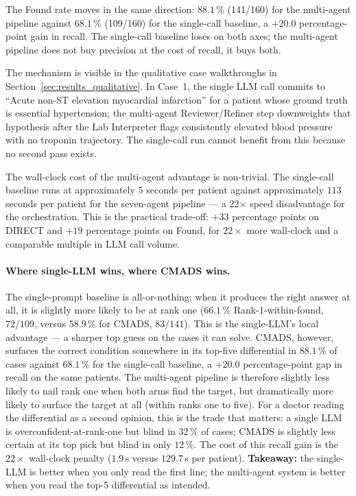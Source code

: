The Found rate moves in the same direction: $88.1\,\%$ (141/160) for
the multi-agent pipeline against $68.1\,\%$ (109/160) for the
single-call baseline, a $+20.0$ percentage-point gain in recall. The
single-call baseline loses on both axes; the multi-agent pipeline
does not buy precision at the cost of recall, it buys both.

The mechanism is visible in the qualitative case walkthroughs in
Section~\ref{sec:results_qualitative}. In Case~1, the single LLM call
commits to ``Acute non-ST elevation myocardial infarction'' for a
patient whose ground truth is essential hypertension; the multi-agent
Reviewer/Refiner step downweights that hypothesis after the Lab
Interpreter flags consistently elevated blood pressure with no
troponin trajectory. The single-call run cannot benefit from this
because no second pass exists.

The wall-clock cost of the multi-agent advantage is
non-trivial. The single-call baseline runs at approximately
$5$ seconds per patient against approximately $113$ seconds per
patient for the seven-agent pipeline --- a 22$\times$ speed
disadvantage for the orchestration. This is the practical trade-off:
$+33$ percentage points on DIRECT and $+19$ percentage points on
Found, for $22\times$ more wall-clock and a comparable multiple in
LLM call volume.

\paragraph{Where single-LLM wins, where CMADS wins.}
The single-prompt baseline is all-or-nothing: when it produces the
right answer at all, it is slightly more likely to be at rank one
($66.1\,\%$ Rank-1-within-found, $72/109$, versus $58.9\,\%$ for
CMADS, $83/141$). This is the single-LLM's local advantage --- a
sharper top guess on the cases it can solve. CMADS, however, surfaces
the correct condition somewhere in its top-five differential in
$88.1\,\%$ of cases against $68.1\,\%$ for the single-call baseline,
a $+20.0$ percentage-point gap in recall on the same patients. The
multi-agent pipeline is therefore slightly less likely to nail rank
one when both arms find the target, but dramatically more likely to
surface the target at all (within ranks one to five). For a doctor
reading the differential as a second opinion, this is the trade that
matters: a single LLM is overconfident-at-rank-one but blind in
$32\,\%$ of cases; CMADS is slightly less certain at its top pick but
blind in only $12\,\%$. The cost of this recall gain is the
$22\times$ wall-clock penalty ($1.9$\,s versus $129.7$\,s per
patient). \textbf{Takeaway:} the single-LLM is better when you only
read the first line; the multi-agent system is better when you read
the top-5 differential as intended.

